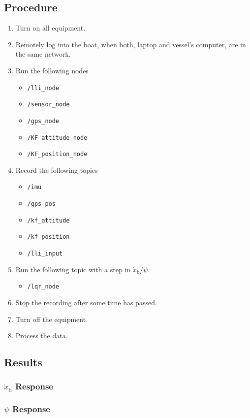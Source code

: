 \subsection*{Procedure}
\begin{enumerate}
    \item Turn on all equipment.
    \item Remotely log into the boat, when both, laptop and vessel's computer, are in the same network.
    \item Run the following nodes
    \begin{itemize}
        \item \lstinline[style=cinline]{/lli_node}
        \item \lstinline[style=cinline]{/sensor_node}
        \item \lstinline[style=cinline]{/gps_node}
        \item \lstinline[style=cinline]{/KF_attitude_node}
        \item \lstinline[style=cinline]{/KF_position_node}  
    \end{itemize}
    \item Record the following topics
    \begin{itemize}
        \item \lstinline[style=cinline]{/imu}   
        \item \lstinline[style=cinline]{/gps_pos}
        \item \lstinline[style=cinline]{/kf_attitude}
        \item \lstinline[style=cinline]{/kf_position}   
        \item \lstinline[style=cinline]{/lli_input}  
    \end{itemize}
    \item Run the following topic with a step in $\dot{x}_\mathrm{b}$/$\psi$.
    \begin{itemize}
        \item \lstinline[style=cinline]{/lqr_node}
    \end{itemize}
    \item Stop the recording after some time has passed.
    \item Turn off the equipment.
    \item Process the data.
\end{enumerate}

\subsection*{Results}

\subsubsection*{$\dot{x}_\mathrm{b}$ Response}
\subsubsection*{$\psi$ Response}

